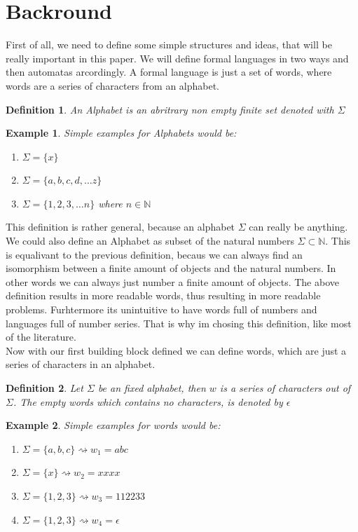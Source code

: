 \documentclass[12pt,letterpaper]{article}
\newtheorem{definition}{Definition}
\newtheorem{example}{Example}[section]
\begin{document}
\section{Backround}
First of all, we need to define some simple structures and ideas,
that will be really important in this paper. We will define 
formal languages in two ways and then automatas arcordingly.
A formal language is just a set of words, where words are 
a series of characters from an alphabet.
\begin{definition}
  An Alphabet is an abritrary non empty finite set denoted with $\Sigma$
\end{definition}
\begin{example} Simple examples for Alphabets would be:
  \begin{enumerate}
    \item $\Sigma = \{x\}$
    \item $\Sigma = \{a,b,c,d, \dots z \}$
    \item $\Sigma = \{1,2,3, \dots n \}$ where $n \in \mathbb{N}$
  \end{enumerate}
\end{example}
This definition is rather general, because an alphabet $\Sigma$
can really be anything. We could also define an Alphabet as subset of
the natural numbers $\Sigma \subset \mathbb{N}$. This is equalivant to
the previous definition, becaus we can always find an isomorphism between
a finite amount of objects and the natural numbers. In other words 
we can always just number a finite amount of objects. The above definition
results in more readable words, thus resulting in more readable problems.
Furhtermore its unintuitive to have words full of numbers and languages
full of number series. That is why im chosing this definition, like most
of the literature.\\
Now with our first building block defined we can define words, which are just
a series of characters in an alphabet.
\begin{definition}
  Let $\Sigma$ be an fixed alphabet, then $w$ is a series of characters out of
  $\Sigma$. The empty words which contains no characters, 
  is denoted by $\epsilon$
\end{definition}
\begin{example}
  Simple examples for words would be:
  \begin{enumerate}
    \item $\Sigma = \{a,b,c\} \rightsquigarrow w_1 = abc$
    \item $\Sigma = \{x\} \rightsquigarrow w_2 = xxxx$
    \item $\Sigma = \{1,2,3\} \rightsquigarrow w_3 = 112233$
    \item $\Sigma = \{1,2,3\} \rightsquigarrow w_4 = \epsilon$
  \end{enumerate}
\end{example}
\end{document}

